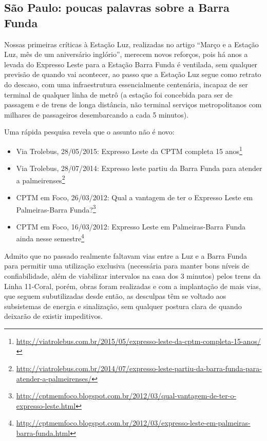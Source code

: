 \documentclass[11pt,fleqn]{book} %
\begin{document}

\subsection{São Paulo: poucas palavras sobre a Barra Funda}

Nossas primeiras críticas à Estação Luz, realizadas no artigo “Março e a Estação Luz, mês de um aniversário inglório”, merecem novos reforços, pois há anos a levada do Expresso Leste para a Estação Barra Funda é ventilada, sem qualquer previsão de quando vai acontecer, ao passo que a Estação Luz segue como retrato do descaso, com uma infraestrutura essencialmente centenária, incapaz de ser terminal de qualquer linha de metrô (a estação foi concebida para ser de passagem e de trens de longa distância, não terminal serviços metropolitanos com milhares de passageiros desembarcando a cada 5 minutos).

Uma rápida pesquisa revela que o assunto não é novo:

\begin{itemize}
	\item Via Trolebus, 28/05/2015: Expresso Leste da CPTM completa 15 anos\footnote{\url{http://viatrolebus.com.br/2015/05/expresso-leste-da-cptm-completa-15-anos/}}
	\item Via Trolebus, 28/07/2014: Expresso leste partiu da Barra Funda para atender a palmeirenses\footnote{\url{http://viatrolebus.com.br/2014/07/expresso-leste-partiu-da-barra-funda-para-atender-a-palmeirenses/}}
	\item CPTM em Foco, 26/03/2012: Qual a vantagem de ter o Expresso Leste em Palmeiras-Barra Funda?\footnote{\url{http://cptmemfoco.blogspot.com.br/2012/03/qual-vantagem-de-ter-o-expresso-leste.html}}
	\item CPTM em Foco, 16/03/2012: Expresso Leste em Palmeiras-Barra Funda ainda nesse semestre\footnote{\url{http://cptmemfoco.blogspot.com.br/2012/03/expresso-leste-em-palmeiras-barra-funda.html}}
\end{itemize}

Admito que no passado realmente faltavam vias entre a Luz e a Barra Funda para permitir uma utilização exclusiva (necessária para manter bons níveis de confiabilidade, além de viabilizar intervalos na casa dos 3 minutos) pelos trens da Linha 11-Coral, porém, obras foram realizadas e com a implantação de mais vias, que seguem subutilizadas desde então, as desculpas têm se voltado aos subsistemas de energia e sinalização, sem qualquer postura clara de quando deixarão de existir impeditivos.
\end{document}
